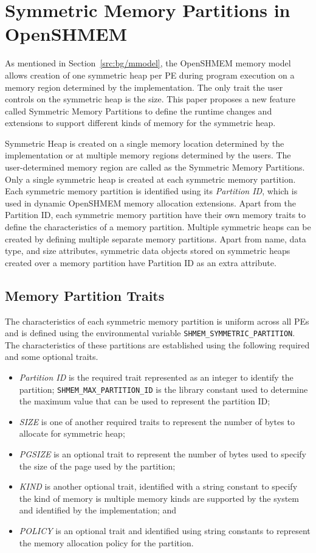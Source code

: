 \section{Symmetric Memory Partitions in OpenSHMEM}
\label{src:smempart}

As mentioned in Section~\ref{src:bg/mmodel}, the OpenSHMEM memory
model allows creation of one symmetric heap per PE during program
execution on a memory region determined by the implementation. The
only trait the user controls on the symmetric heap is the size. This
paper proposes a new feature called Symmetric Memory Partitions to
define the runtime changes and extensions to support different kinds
of memory for the symmetric heap.

Symmetric Heap is created on a single memory location determined by
the implementation or at multiple memory regions determined by the
users. The user-determined memory region are called as the Symmetric
Memory Partitions. Only a single symmetric heap is created at each
symmetric memory partition. Each symmetric memory partition is
identified using its \emph{Partition ID}, which is used in dynamic
OpenSHMEM memory allocation extensions. Apart from the Partition ID,
each symmetric memory partition have their own memory traits to define
the characteristics of a memory partition. Multiple symmetric heaps
can be created by defining multiple separate memory partitions. Apart
from name, data type, and size attributes, symmetric data objects
stored on symmetric heaps created over a memory partition have
Partition ID as an extra attribute.

\subsection{Memory Partition Traits}
\label{src:smempart/traits}
The characteristics of each symmetric memory partition is uniform
across all PEs and is defined using the environmental variable
\texttt{SHMEM\_SYMMETRIC\_PARTITION}. The characteristics of these
partitions are established using the following required and some
optional traits.
\begin{itemize}
    \item \emph{Partition ID} is the required trait represented as
    an integer to identify the partition;
    \texttt{SHMEM\_MAX\_PARTITION\_ID} is the library constant used
    to determine the maximum value that can be used to represent
    the partition ID;
    \item \emph{SIZE} is one of another required traits to
    represent the number of bytes to allocate for symmetric heap;
    \item \emph{PGSIZE} is an optional trait to represent the
    number of bytes used to specify the size of the page used by
    the partition;
    \item \emph{KIND} is another optional trait, identified with a
    string constant to specify the kind of memory is multiple memory
    kinds are supported by the system and identified by the
    implementation; and
    \item \emph{POLICY} is an optional trait and identified using
    string constants to represent the memory allocation policy for
    the partition.
\end{itemize}

